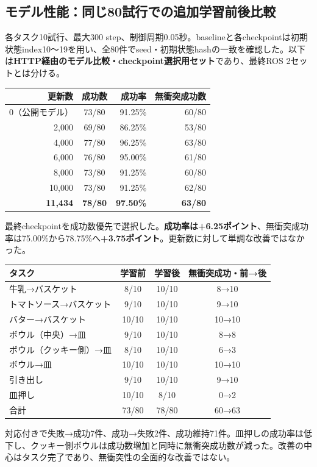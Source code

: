 \documentclass[paper=a4,fontsize=10pt,baselineskip=15pt]{jlreq}
\begin{document}
\subsection{モデル性能：同じ80試行での追加学習前後比較}
各タスク10試行、最大300 step、制御周期0.05秒。baselineと各checkpointは初期状態index10〜19を用い、全80件でseed・初期状態hashの一致を確認した。以下は\textbf{HTTP経由のモデル比較・checkpoint選択用セット}であり、最終ROS 2セットとは分ける。
\begin{center}
\begin{tabular}{@{}rcrr@{}}\toprule
更新数 & 成功数 & 成功率 & 無衝突成功数 \\\midrule
0（公開モデル） & 73/80 & 91.25\% & 60/80\\
2,000 & 69/80 & 86.25\% & 53/80\\
4,000 & 77/80 & 96.25\% & 63/80\\
6,000 & 76/80 & 95.00\% & 61/80\\
8,000 & 73/80 & 91.25\% & 60/80\\
10,000 & 73/80 & 91.25\% & 62/80\\
\textbf{11,434} & \textbf{78/80} & \textbf{97.50\%} & \textbf{63/80}\\\bottomrule
\end{tabular}
\end{center}
最終checkpointを成功数優先で選択した。\textbf{成功率は+6.25ポイント}、無衝突成功率は75.00\%から78.75\%へ\textbf{+3.75ポイント}。更新数に対して単調な改善ではなかった。
\begin{center}
\begin{tabular}{@{}lccc@{}}\toprule
タスク & 学習前 & 学習後 & 無衝突成功・前→後\\\midrule
牛乳→バスケット & 8/10 & 10/10 & 8→10\\
トマトソース→バスケット & 9/10 & 10/10 & 9→10\\
バター→バスケット & 10/10 & 10/10 & 10→10\\
ボウル（中央）→皿 & 9/10 & 10/10 & 8→8\\
ボウル（クッキー側）→皿 & 8/10 & 10/10 & 6→3\\
ボウル→皿 & 10/10 & 10/10 & 10→10\\
引き出し & 9/10 & 10/10 & 9→10\\
皿押し & 10/10 & 8/10 & 0→2\\\midrule
合計 & 73/80 & 78/80 & 60→63\\\bottomrule
\end{tabular}
\end{center}
対応付きで失敗→成功7件、成功→失敗2件、成功維持71件。皿押しの成功率は低下し、クッキー側ボウルは成功数増加と同時に無衝突成功数が減った。改善の中心はタスク完了であり、無衝突性の全面的な改善ではない。
\end{document}
